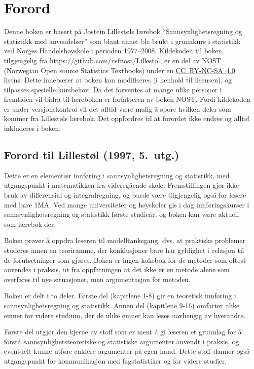 
\chapter*{Forord}

Denne boken er basert på Jostein Lillestøls lærebok 
``Sannsynlighetsregning og statistikk med anvendelser'' som blant annet ble
brukt i grunnkurs i statistikk ved Norges Handelshøyskole i perioden 1977--2008.
Kildekoden til boken, tilgjengelig fra \url{https://github.com/nsfnost/Lillestol}, er en del av NOST (Norwegian Open source Statistics Textbooks)
under en \href{https://creativecommons.org/licenses/by-nc-sa/4.0/}{CC~BY-NC-SA~4.0} lisens. Dette innebærer
at boken kan modifiseres (i henhold til lisensen), og tilpasses spesielle kursbehov.
Da det forventes at mange ulike personer i fremtiden vil bidra til læreboken
er forfatteren av boken NOST. Fordi kildekoden er under versjonskontrol vil
det alltid være mulig å spore hvilken deler som kommer fra Lillestøls lærebok.
Det oppfordres til at forordet ikke endres og alltid inkluderes i boken.

\section*{Forord til Lillestøl (1997, 5.~utg.)}
Dette er en elementær innføring i sannsynlighetsregning og
statistikk, med utgangspunkt i matematikken fra videregående skole.
Fremstillingen gjør ikke bruk av differensial og integralregning,
og burde være tilgjengelig også for lesere med bare 1MA.
Ved mange universiteter og høyskoler gis i dag innføringskurser i
sannsynlighetsregning og statistikk første studieår, og boken kan
være aktuell som lærebok der.

Boken prøver å oppdra leseren til modelltankegang, dvs. at
praktiske problemer studeres innen en teoriramme, der konklusjoner
bare har gyldighet i relasjon til de forutsetninger som gjøres.
Boken er ingen kokebok for de metoder som oftest anvendes i praksis,
ut fra oppfatningen at det ikke er en metode alene som overføres til nye
situasjoner, men argumentasjon for metoden.

Boken er delt i to deler.  Første del (kapitlene 1-8) gir en teoretisk
innføring i sannsynlighetsregning og statistikk.  Annen del (kapitlene
9-16) omfatter ulike emner for videre studium, der de ulike emner kan leses
uavhengig av hverandre.

Første del utgjør den kjerne av stoff som er ment å gi leseren
et grunnlag for å forstå sannsynlighetsteoretiske og statistiske
argumenter anvendt i praksis, og eventuelt kunne utføre enklere 
argumenter på egen hånd.  Dette stoff danner også utgangspunkt 
for kommunikasjon med fagstatistiker og for videre studier.

